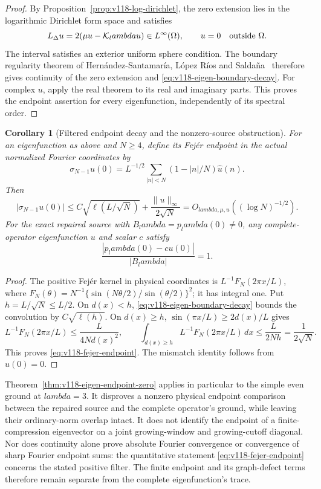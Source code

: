 \documentclass[11pt]{article}
\def\lambda{lambda}%
\newtheorem{corollary}[theorem]{Corollary}
\theoremstyle{remark}
\begin{document}
\begin{proof}
By Proposition~\ref{prop:v118-log-dirichlet}, the zero extension lies
in the logarithmic Dirichlet form space and satisfies
\[
 L_\Delta u=2(\mu u-\mathcal K_\lambda u)\in L^\infty(\Omega),
 \qquad u=0\quad\hbox{outside }\Omega.
\]
The interval satisfies an exterior uniform sphere condition.
The boundary regularity theorem of Hern\'andez-Santamar\'ia,
L\'opez R\'ios and Salda\~na~\cite[Theorem~1.1]{HLSLogBoundary}
therefore gives continuity of the zero extension and
\eqref{eq:v118-eigen-boundary-decay}.  For complex $u$, apply the
real theorem to its real and imaginary parts.  This proves the endpoint
assertion for every eigenfunction, independently of its spectral order.
\end{proof}

\begin{corollary}[Filtered endpoint decay and the nonzero-source obstruction]
\label{cor:v118-ground-fejer}
For an eigenfunction as above and $N\ge4$, define its Fej\'er endpoint
in the actual normalized Fourier coordinates by
\[
 \sigma_{N-1}u(0)=L^{-1/2}
       \sum_{|n|<N}(1-|n|/N)\widehat u(n).
\]
Then
\begin{equation}\label{eq:v118-fejer-endpoint}
 |\sigma_{N-1}u(0)|
 \le C\sqrt{\ell(L/\sqrt N)}+\frac{\|u\|_\infty}{2\sqrt N}
 =O_{\lambda,\mu,u}((\log N)^{-1/2}).
\end{equation}
For the exact repaired source with $B_\lambda=p_\lambda(0)\ne0$,
any complete-operator eigenfunction $u$ and scalar $c$ satisfy
\begin{equation}\label{eq:v118-ground-source-mismatch}
 \frac{|p_\lambda(0)-cu(0)|}{|B_\lambda|}=1.
\end{equation}
\end{corollary}
\begin{proof}
The positive Fej\'er kernel in physical coordinates is
$L^{-1}F_N(2\pi x/L)$, where
$F_N(\theta)=N^{-1}\{\sin(N\theta/2)/\sin(\theta/2)\}^2$;
it has integral one.  Put $h=L/\sqrt N\le L/2$.
On $d(x)<h$, \eqref{eq:v118-eigen-boundary-decay} bounds the
convolution by $C\sqrt{\ell(h)}$.
On $d(x)\ge h$, $\sin(\pi x/L)\ge2d(x)/L$ gives
\[
 L^{-1}F_N(2\pi x/L)\le\frac{L}{4N d(x)^2},\qquad
 \int_{d(x)\ge h}L^{-1}F_N(2\pi x/L)\,dx
       \le\frac{L}{2Nh}=\frac1{2\sqrt N}.
\]
This proves \eqref{eq:v118-fejer-endpoint}.
The mismatch identity follows from $u(0)=0$.
\end{proof}

Theorem~\ref{thm:v118-eigen-endpoint-zero} applies in particular to
the simple even ground at $\lambda=3$.  It disproves a nonzero physical
endpoint comparison between the repaired source and the complete
operator's ground, while leaving their ordinary-norm overlap intact.
It does not identify the endpoint of a finite-compression eigenvector
on a joint growing-window and growing-cutoff diagonal.
Nor does continuity alone prove absolute Fourier convergence or
convergence of sharp Fourier endpoint sums: the quantitative statement
\eqref{eq:v118-fejer-endpoint} concerns the stated positive filter.
The finite endpoint and its graph-defect terms therefore remain
separate from the complete eigenfunction's trace.
\end{document}
